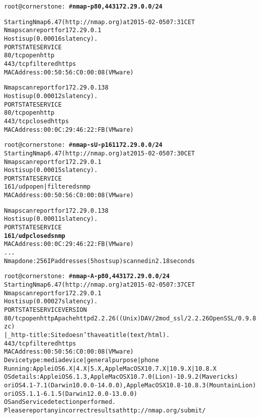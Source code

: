 \documentclass[20pt,landscape,a4paper,footrule]{foils}
\begin{document}

\begin{alltt}\small
root@cornerstone:~#{\bfseries  nmap -p80,443 172.29.0.0/24}

Starting Nmap 6.47 ( http://nmap.org ) at 2015-02-05 07:31 CET
Nmap scan report for 172.29.0.1
Host is up (0.00016s latency).
PORT    STATE    SERVICE
{\color{darkgreen}80/tcp  open     http}
443/tcp filtered https
MAC Address: 00:50:56:C0:00:08 (VMware)

Nmap scan report for 172.29.0.138
Host is up (0.00012s latency).
PORT    STATE  SERVICE
{\color{darkgreen}80/tcp  open   http}
443/tcp closed https
MAC Address: 00:0C:29:46:22:FB (VMware)

\end{alltt}


\begin{alltt}\small
root@cornerstone:~#{\bfseries nmap -sU -p 161 172.29.0.0/24}
Starting Nmap 6.47 ( http://nmap.org ) at 2015-02-05 07:30 CET
Nmap scan report for 172.29.0.1
Host is up (0.00015s latency).
PORT    STATE         SERVICE
{\color{darkgreen}161/udp open|filtered snmp}
MAC Address: 00:50:56:C0:00:08 (VMware)

Nmap scan report for 172.29.0.138
Host is up (0.00011s latency).
PORT    STATE  SERVICE
{\bf{161/udp closed snmp}}
MAC Address: 00:0C:29:46:22:FB (VMware)
...
Nmap done: 256 IP addresses (5 hosts up) scanned in 2.18 seconds
\end{alltt}

\begin{alltt}\footnotesize
root@cornerstone:~#{\bfseries nmap -A -p80,443 172.29.0.0/24}
Starting Nmap 6.47 ( http://nmap.org ) at 2015-02-05 07:37 CET
Nmap scan report for 172.29.0.1
Host is up (0.00027s latency).
PORT    STATE    SERVICE VERSION
80/tcp  open     http    Apache httpd 2.2.26 ((Unix) DAV/2 mod_ssl/2.2.26 OpenSSL/0.9.8zc)
|_http-title: Site doesn't have a title (text/html).
443/tcp filtered https
MAC Address: 00:50:56:C0:00:08 (VMware)
Device type: media device|general purpose|phone
Running: Apple iOS 6.X|4.X|5.X, Apple Mac OS X 10.7.X|10.9.X|10.8.X
OS details: Apple iOS 6.1.3, Apple Mac OS X 10.7.0 (Lion) - 10.9.2 (Mavericks)
or iOS 4.1 - 7.1 (Darwin 10.0.0 - 14.0.0), Apple Mac OS X 10.8 - 10.8.3 (Mountain Lion)
or iOS 5.1.1 - 6.1.5 (Darwin 12.0.0 - 13.0.0)
OS and Service detection performed.
Please report any incorrect results at http://nmap.org/submit/
\end{alltt}
\end{document}
